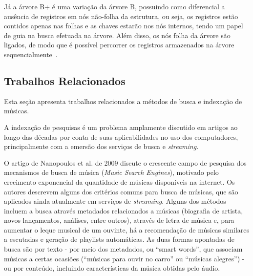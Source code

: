\documentclass[12pt]{article}
\begin{document}


Já a árvore B+ é uma variação da árvore B, possuindo como
diferencial a ausência de registros em nós não-folha da estrutura, ou seja,
os registros estão contidos apenas nas folhas e as chaves estarão nos nós internos,
tendo um papel de guia na busca efetuada na árvore.
Além disso, os nós folha da árvore são ligados, de modo que é possível percorrer
os registros armazenados na árvore sequencialmente~\cite{Pm:10}.


\subsection{Trabalhos Relacionados}
Esta seção apresenta trabalhos relacionados a métodos de busca e indexação de 
músicas.

A indexação de pesquisas é um problema amplamente discutido em artigos ao longo
das décadas por conta de suas aplicabilidades no uso dos computadores,
principalmente com a emersão dos serviços de busca e \emph{streaming}.

O artigo de Nanopoulos et al. de 2009 discute o crescente campo de pesquisa dos
mecanismos de busca de música (\emph{Music Search Engines}), motivado pelo
crecimento exponencial da quantidade de músicas disponíveis na internet.
Os autores descrevem alguns dos critérios comuns para busca de músicas, que são
aplicados ainda atualmente em serviços de \emph{streaming}.
Alguns dos métodos incluem a busca através metadados relacionados a músicas (biografia de
artista, novos lançamentos, análises, entre outros), através de letra de música
e, para aumentar o leque musical de um ouvinte, há a recomendação de músicas
similares a escutadas e geração de playlists automáticas.
As duas formas apontadas de busca são por texto - por meio dos metadados, ou “smart words”,
que associam músicas a certas ocasiões (``músicas para ouvir no carro'' ou ``músicas
alegres'') - ou por conteúdo, incluindo características da música obtidas pelo áudio.
\end{document}
